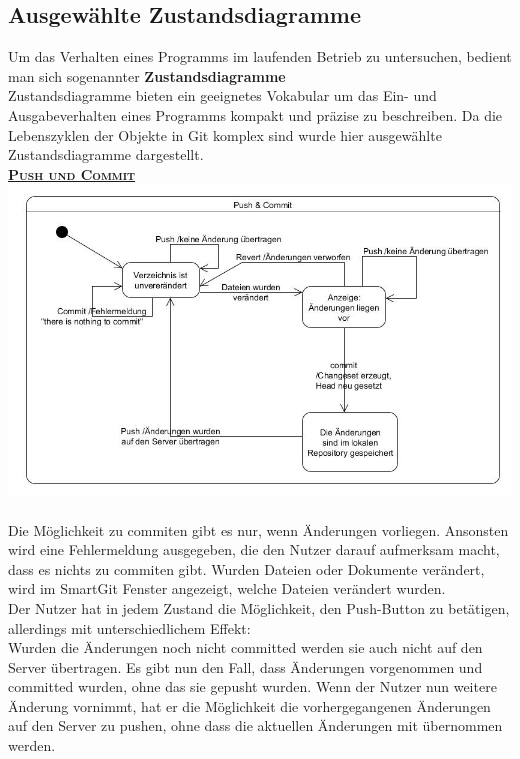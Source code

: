 \documentclass[a4paper]{article}
\begin{document}
\newpage		
\subsection{Ausgewählte Zustandsdiagramme} \label{sec:zustandsd}

	Um das Verhalten eines Programms im laufenden Betrieb zu untersuchen, bedient man sich sogenannter \textbf{Zustandsdiagramme} \\
	Zustandsdiagramme bieten ein geeignetes Vokabular um das Ein- und Ausgabeverhalten eines Programms kompakt und präzise zu beschreiben.
	Da die Lebenszyklen der Objekte in Git komplex sind wurde hier ausgewählte Zustandsdiagramme dargestellt. \\

\underline{\textbf{\textsc{Push und Commit}}} \\
\includegraphics[width=\textwidth]{PuCo.jpg}\\\\
Die Möglichkeit zu commiten gibt es nur, wenn Änderungen vorliegen. Ansonsten wird eine Fehlermeldung ausgegeben, die den Nutzer darauf aufmerksam macht, dass es nichts zu commiten gibt.
Wurden Dateien oder Dokumente verändert, wird im SmartGit Fenster angezeigt, welche Dateien verändert wurden.\\
Der Nutzer hat in jedem Zustand die Möglichkeit, den Push-Button zu betätigen, allerdings mit unterschiedlichem Effekt:\\
Wurden die Änderungen noch nicht committed werden sie auch nicht auf den Server übertragen.
Es gibt nun den Fall, dass Änderungen vorgenommen und committed wurden, ohne das sie gepusht wurden.
Wenn der Nutzer nun weitere Änderung vornimmt, hat er die Möglichkeit die vorhergegangenen Änderungen auf den Server zu pushen, ohne dass die aktuellen Änderungen mit übernommen werden. 
\end{document}
